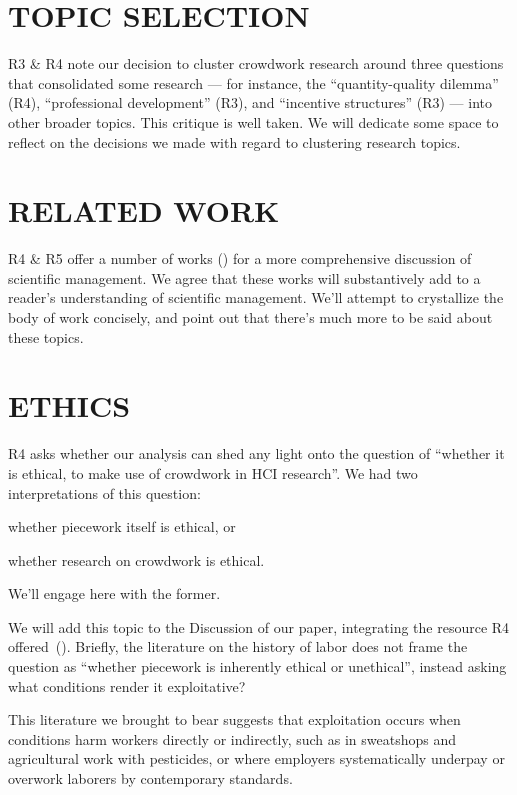 \documentclass[11pt]{article}
\begin{document}
\section*{TOPIC SELECTION}
R3 \& R4 note our decision to cluster crowdwork research around three questions
that consolidated some research
--- for instance,
the ``quantity-quality dilemma'' (R4),
``professional development'' (R3),
and ``incentive structures'' (R3) --- into other broader topics.
This critique is well taken.
We will dedicate some space to reflect on
the decisions we made with regard to clustering research topics.

\section*{RELATED WORK}
R4 \& R5 offer a number of works
(\cite[e.g.][]{williamson2016})
for a more comprehensive discussion of scientific management.
We agree that these works will
substantively add to a reader's understanding of scientific management.
We'll attempt to crystallize the body of work concisely, and
point out that there's much more to be said about these topics.

\section*{ETHICS}
R4 asks whether our analysis can shed any light onto the question of
``whether it is ethical, to make use of crowdwork in HCI research''.
We had two interpretations of this question:
\begin{inlinelist}
  \item whether piecework itself is ethical, or
  \item whether research on crowdwork is ethical. 
\end{inlinelist}
We'll engage here with the former.

We will add this topic to the Discussion of our paper,
integrating the resource R4 offered~(\cite{williamson2016}).
Briefly, the literature on the history of labor does not
frame the question as ``whether piecework is inherently ethical or unethical'',
instead asking what conditions render it exploitative?

This literature we brought to bear suggests that exploitation occurs when
conditions harm workers directly or indirectly, such as
in sweatshops and agricultural work with pesticides, or where
employers systematically underpay or overwork laborers by contemporary standards.
\end{document}
